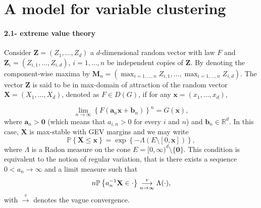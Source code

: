 \documentclass[11pt]{article}
\begin{document}
	\section{A model for variable clustering}
	\label{sec:variable_clust}
	
	\paragraph{2.1- extreme value theory} Consider $\textbf{Z}= (Z_1,\dots, Z_d)$ a $d$-dimensional random vector with law $F$ and $\textbf{Z}_{i} = (Z_{i,1},\dots, Z_{i,d})$, $i = 1,\dots,n$ be independent copies of $\textbf{Z}$. By denoting the component-wise maxima by $\textbf{M}_n = (\max_{i=1,\dots,n} Z_{i,1}, \dots, \max_{i=1,\dots,n} Z_{i,d})$. The vector $\textbf{Z}$ is said to be in max-domain of attraction of the random vector $\textbf{X} = (X_1, \dots, X_d)$, denoted as $F \in D(G)$, if for any $\textbf{x} = (x_1,\dots,x_d)$,
	
	\begin{equation}
		\label{eq:domain_attraction}
		\underset{n \rightarrow \infty}{\lim} \left\{ F(\textbf{a}_n \textbf{x} + \textbf{b}_n) \right\}^n = G(\textbf{x}),
	\end{equation}
	where $\textbf{a}_n > \textbf{0}$ (which means that $a_{i,n} > 0$ for every $i$ and $n$) and $\textbf{b}_n \in \mathbb{R}^d$. In this case, $\textbf{X}$ is max-stable with GEV margins and we may write
	\begin{equation*}
		\mathbb{P}\left\{ \textbf{X} \leq \textbf{x}\right\} = \exp \left\{ -\Lambda(E \setminus [0,\textbf{x}]) \right\},
	\end{equation*}
	where $\Lambda$ is a Radon measure on the cone $E = [0,\infty)^d \setminus \{\textbf{0}\}$. This condition is equivalent to the notion of regular variation, that is there exists a sequence $0 < a_n \rightarrow \infty$ and a limit measure such that
	\begin{equation*}
		n \mathbb{P}\left\{ a_n^{-1} \textbf{X} \in \cdot \right\} \overunderset{v}{n \rightarrow \infty}{\longrightarrow} \Lambda(\cdot),
	\end{equation*}
	with $\overset{v}{\rightarrow}$ denotes the vague convergence.
	
\end{document}
